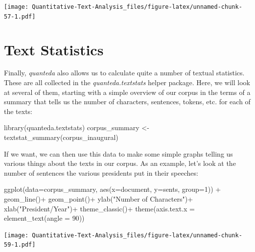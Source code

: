 \documentclass[
]{book}
\newenvironment{Shaded}{\begin{snugshade}}{\end{snugshade}}
\newcommand{\AttributeTok}[1]{\textcolor[rgb]{0.77,0.63,0.00}{#1}}
\newcommand{\DecValTok}[1]{\textcolor[rgb]{0.00,0.00,0.81}{#1}}
\newcommand{\FunctionTok}[1]{\textcolor[rgb]{0.00,0.00,0.00}{#1}}
\newcommand{\NormalTok}[1]{#1}
\newcommand{\OtherTok}[1]{\textcolor[rgb]{0.56,0.35,0.01}{#1}}
\newcommand{\SpecialCharTok}[1]{\textcolor[rgb]{0.00,0.00,0.00}{#1}}
\newcommand{\StringTok}[1]{\textcolor[rgb]{0.31,0.60,0.02}{#1}}
\begin{document}
\texttt{[image: Quantitative-Text-Analysis\_files/figure-latex/unnamed-chunk-57-1.pdf]}

\hypertarget{text-statistics}{%
\section{Text Statistics}\label{text-statistics}}

Finally, \emph{quanteda} also allows us to calculate quite a number of textual statistics. These are all collected in the \emph{quanteda.textstats} helper package. Here, we will look at several of them, starting with a simple overview of our corpus in the terms of a summary that tells us the number of characters, sentences, tokens, etc. for each of the texts:

\begin{Shaded}
\begin{Highlighting}[]
\FunctionTok{library}\NormalTok{(quanteda.textstats)}
\NormalTok{corpus\_summary }\OtherTok{\textless{}{-}} \FunctionTok{textstat\_summary}\NormalTok{(corpus\_inaugural)}
\end{Highlighting}
\end{Shaded}

If we want, we can then use this data to make some simple graphs telling us various things about the texts in our corpus. As an example, let's look at the number of sentences the various presidents put in their speeches:

\begin{Shaded}
\begin{Highlighting}[]
\FunctionTok{ggplot}\NormalTok{(}\AttributeTok{data=}\NormalTok{corpus\_summary, }\FunctionTok{aes}\NormalTok{(}\AttributeTok{x=}\NormalTok{document, }\AttributeTok{y=}\NormalTok{sents, }\AttributeTok{group=}\DecValTok{1}\NormalTok{)) }\SpecialCharTok{+}
  \FunctionTok{geom\_line}\NormalTok{()}\SpecialCharTok{+}
  \FunctionTok{geom\_point}\NormalTok{()}\SpecialCharTok{+}
  \FunctionTok{ylab}\NormalTok{(}\StringTok{"Number of Characters"}\NormalTok{)}\SpecialCharTok{+}
  \FunctionTok{xlab}\NormalTok{(}\StringTok{"President/Year"}\NormalTok{)}\SpecialCharTok{+}
  \FunctionTok{theme\_classic}\NormalTok{()}\SpecialCharTok{+}
  \FunctionTok{theme}\NormalTok{(}\AttributeTok{axis.text.x =} \FunctionTok{element\_text}\NormalTok{(}\AttributeTok{angle =} \DecValTok{90}\NormalTok{))}
\end{Highlighting}
\end{Shaded}

\texttt{[image: Quantitative-Text-Analysis\_files/figure-latex/unnamed-chunk-59-1.pdf]}
\end{document}
